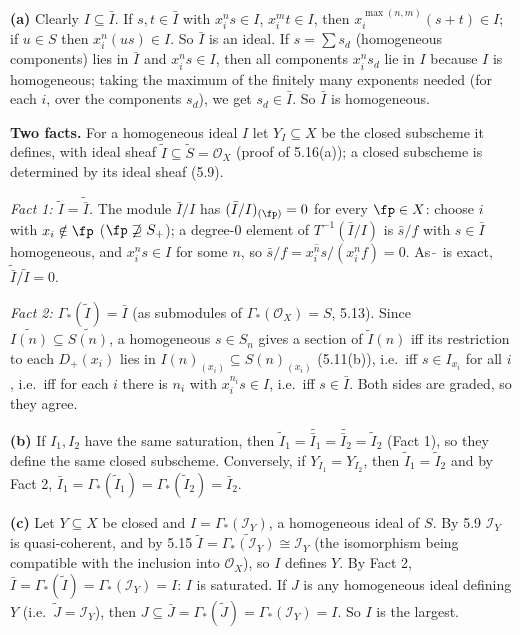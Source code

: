 \documentclass[11pt]{article}
\begin{document}
\textbf{(a)} Clearly $I\subseteq\bar I$. If $s,t\in\bar I$ with $x_i^ns\in I$, $x_i^mt\in I$, then $x_i^{\max(n,m)}(s+t)\in I$; if $u\in S$ then $x_i^n(us)\in I$. So $\bar I$ is an ideal. If $s=\sum s_d$ (homogeneous components) lies in $\bar I$ and $x_i^ns\in I$, then all components $x_i^ns_d$ lie in $I$ because $I$ is homogeneous; taking the maximum of the finitely many exponents needed (for each $i$, over the components $s_d$), we get $s_d\in\bar I$. So $\bar I$ is homogeneous.

\textbf{Two facts.} For a homogeneous ideal $I$ let $Y_I\subseteq X$ be the closed subscheme it defines, with ideal sheaf $\widetilde I\subseteq\widetilde S=\mathcal O_X$ (proof of 5.16(a)); a closed subscheme is determined by its ideal sheaf (5.9).

\emph{Fact 1: $\widetilde I=\widetilde{\bar I}$.} The module $\bar I/I$ has $(\bar I/I)_{(\fp)}=0$ for every $\fp\in X$: choose $i$ with $x_i\notin\fp$ ($\fp\not\supseteq S_+$); a degree-$0$ element of $T^{-1}(\bar I/I)$ is $\bar s/f$ with $s\in\bar I$ homogeneous, and $x_i^ns\in I$ for some $n$, so $\bar s/f=\overline{x_i^ns}/(x_i^nf)=0$. As $\widetilde{\ }$ is exact, $\widetilde{\bar I}/\widetilde I=0$.

\emph{Fact 2: $\Gamma_*(\widetilde I)=\bar I$} (as submodules of $\Gamma_*(\mathcal O_X)=S$, 5.13). Since $\widetilde{I(n)}\subseteq\widetilde{S(n)}$, a homogeneous $s\in S_n$ gives a section of $\widetilde I(n)$ iff its restriction to each $D_+(x_i)$ lies in $I(n)_{(x_i)}\subseteq S(n)_{(x_i)}$ (5.11(b)), i.e.\ iff $s\in I_{x_i}$ for all $i$, i.e.\ iff for each $i$ there is $n_i$ with $x_i^{n_i}s\in I$, i.e.\ iff $s\in\bar I$. Both sides are graded, so they agree.

\textbf{(b)} If $I_1,I_2$ have the same saturation, then $\widetilde I_1=\widetilde{\bar I_1}=\widetilde{\bar I_2}=\widetilde I_2$ (Fact 1), so they define the same closed subscheme. Conversely, if $Y_{I_1}=Y_{I_2}$, then $\widetilde I_1=\widetilde I_2$ and by Fact 2, $\bar I_1=\Gamma_*(\widetilde I_1)=\Gamma_*(\widetilde I_2)=\bar I_2$.

\textbf{(c)} Let $Y\subseteq X$ be closed and $I=\Gamma_*(\mathcal I_Y)$, a homogeneous ideal of $S$. By 5.9 $\mathcal I_Y$ is quasi-coherent, and by 5.15 $\widetilde I=\widetilde{\Gamma_*(\mathcal I_Y)}\cong\mathcal I_Y$ (the isomorphism being compatible with the inclusion into $\mathcal O_X$), so $I$ defines $Y$. By Fact 2, $\bar I=\Gamma_*(\widetilde I)=\Gamma_*(\mathcal I_Y)=I$: $I$ is saturated. If $J$ is any homogeneous ideal defining $Y$ (i.e.\ $\widetilde J=\mathcal I_Y$), then $J\subseteq\bar J=\Gamma_*(\widetilde J)=\Gamma_*(\mathcal I_Y)=I$. So $I$ is the largest.
\end{document}
